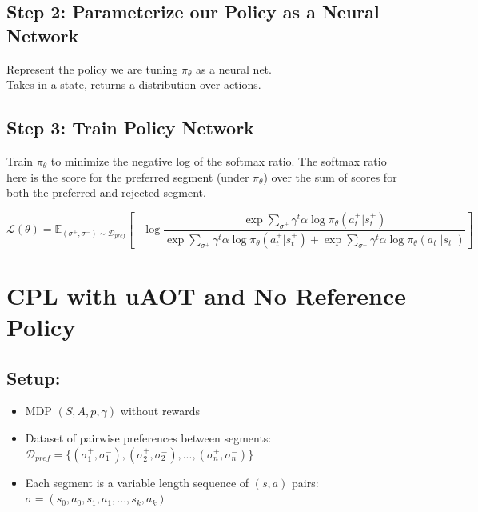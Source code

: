 \documentclass{article}
\begin{document}
\subsection*{Step 2: Parameterize our Policy as a Neural Network}
Represent the policy we are tuning $\pi_\theta$ as a neural net.\\
Takes in a state, returns a distribution over actions.

\subsection*{Step 3: Train Policy Network}
Train $\pi_\theta$ to minimize the negative log of the softmax ratio.
The softmax ratio here is the score for the preferred segment (under $\pi_\theta$) over the sum of scores for both the preferred and rejected segment.

$$\mathcal{L}(\theta) = \mathbb{E}_{(\sigma^+, \sigma^-) \sim \mathcal{D}_{pref}} \left[ -\log \frac{\exp \sum_{\sigma^+} \gamma^t \alpha \log \pi_\theta(a_t^+|s_t^+)}{\exp \sum_{\sigma^+} \gamma^t \alpha \log \pi_\theta(a_t^+|s_t^+) + \exp \sum_{\sigma^-} \gamma^t \alpha \log \pi_\theta(a_t^-|s_t^-)} \right]$$

\newpage





\section*{CPL with uAOT and No Reference Policy}

\subsection*{Setup:}
\begin{itemize}
    \item MDP $(S,A,p,\gamma)$ without rewards
    \item Dataset of pairwise preferences between segments: $\mathcal{D}_{pref} = \{(\sigma_1^+, \sigma_1^-), (\sigma_2^+, \sigma_2^-), ..., (\sigma_n^+, \sigma_n^-)\}$
    \item Each segment is a variable length sequence of $(s, a)$ pairs: $\sigma = (s_0, a_0, s_1, a_1, ..., s_k, a_k)$

\end{itemize}
\end{document}

